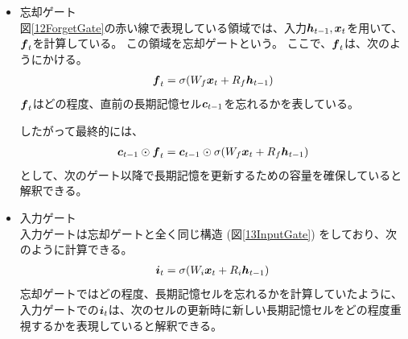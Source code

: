 \begin{itemize}
  \item 忘却ゲート\\
  図\ref{12ForgetGate}の赤い線で表現している領域では、入力${\mbox{\boldmath{$h$}}}_{t-1},{\mbox{\boldmath{$x$}}}_t$を用いて、${\mbox{\boldmath{$f$}}}_{t}$を計算している。
  この領域を忘却ゲートという。
  ここで、${\mbox{\boldmath{$f$}}}_{t}$は、次のようにかける。
\begin{equation}
 \begin{split}
  {\mbox{\boldmath{$f$}}}_{t} = \sigma (W_f {\mbox{\boldmath{$x$}}}_t + R_f {\mbox{\boldmath{$h$}}}_{t-1})
 \end{split}
\end{equation}
  ${\mbox{\boldmath{$f$}}}_{t}$はどの程度、直前の長期記憶セル${\mbox{\boldmath{$c$}}}_{t-1}$を忘れるかを表している。
  
  したがって最終的には、
\begin{equation}
 \begin{split}
  {\mbox{\boldmath{$c$}}}_{t-1} \odot {\mbox{\boldmath{$f$}}}_{t} 
  = {\mbox{\boldmath{$c$}}}_{t-1} \odot \sigma (W_f {\mbox{\boldmath{$x$}}}_t + R_f {\mbox{\boldmath{$h$}}}_{t-1})
 \end{split}
\end{equation}
  として、次のゲート以降で長期記憶を更新するための容量を確保していると解釈できる。

  \item 入力ゲート\\
  入力ゲートは忘却ゲートと全く同じ構造 (図\ref{13InputGate}) をしており、次のように計算できる。
\begin{equation}
 \begin{split}
  {\mbox{\boldmath{$i$}}}_{t} = \sigma (W_i {\mbox{\boldmath{$x$}}}_t + R_i {\mbox{\boldmath{$h$}}}_{t-1})
 \end{split}
\end{equation}
  忘却ゲートではどの程度、長期記憶セルを忘れるかを計算していたように、入力ゲートでの${\mbox{\boldmath{$i$}}}_{t}$は、次のセルの更新時に新しい長期記憶セルをどの程度重視するかを表現していると解釈できる。
    

\end{itemize}
